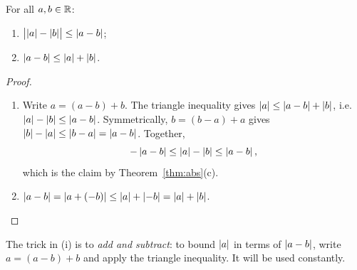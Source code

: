 \begin{cor}
  For all $a, b \in \R$:
  \begin{enumerate}
    \item $\bigl|\abs{a} - \abs{b}\bigr| \leq \abs{a - b}$;
    \item $\abs{a - b} \leq \abs{a} + \abs{b}$.
  \end{enumerate}
\end{cor}

\begin{proof}\leavevmode
  \begin{enumerate}
    \item Write $a = (a - b) + b$. The triangle inequality gives
      $\abs{a} \leq \abs{a - b} + \abs{b}$, i.e.\
      $\abs{a} - \abs{b} \leq \abs{a - b}$. Symmetrically, $b = (b - a) + a$
      gives $\abs{b} - \abs{a} \leq \abs{b - a} = \abs{a - b}$. Together,
      \[
        -\abs{a - b} \leq \abs{a} - \abs{b} \leq \abs{a - b},
      \]
      which is the claim by Theorem~\ref{thm:abs}(c).
    \item $\abs{a - b} = \abs{a + (-b)} \leq \abs{a} + \abs{-b} = \abs{a} + \abs{b}$.\qedhere
  \end{enumerate}
\end{proof}

\begin{remark}
  The trick in (i) is to \emph{add and subtract}: to bound $\abs{a}$ in terms
  of $\abs{a - b}$, write $a = (a - b) + b$ and apply the triangle
  inequality. It will be used constantly.
\end{remark}
